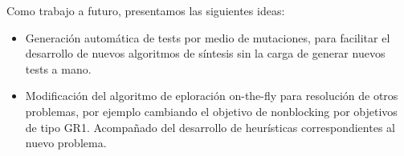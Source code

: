 Como trabajo a futuro, presentamos las siguientes ideas: 
\begin{itemize}
	\item Generación automática de tests por medio de mutaciones, para facilitar el desarrollo de nuevos algoritmos de síntesis sin la carga de generar nuevos tests a mano. 
	
	\item Modificación del algoritmo de eploración on-the-fly para resolución de otros problemas, por ejemplo cambiando el objetivo de nonblocking por objetivos de tipo GR1. Acompañado del desarrollo de heurísticas correspondientes al nuevo problema.
\end{itemize}


